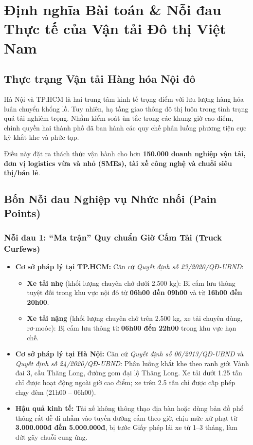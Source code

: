 \documentclass[11pt,a4paper]{article}
\begin{document}
\section{Định nghĩa Bài toán \& Nỗi đau Thực tế của Vận tải Đô thị Việt Nam}

\subsection{Thực trạng Vận tải Hàng hóa Nội đô}
Hà Nội và TP.HCM là hai trung tâm kinh tế trọng điểm với lưu lượng hàng hóa luân chuyển khổng lồ. Tuy nhiên, hạ tầng giao thông đô thị luôn trong tình trạng quá tải nghiêm trọng. Nhằm kiểm soát ùn tắc trong các khung giờ cao điểm, chính quyền hai thành phố đã ban hành các quy chế phân luồng phương tiện cực kỳ khắt khe và phức tạp.

Điều này đặt ra thách thức vận hành cho hơn \textbf{150.000 doanh nghiệp vận tải, đơn vị logistics vừa và nhỏ (SMEs), tài xế công nghệ và chuỗi siêu thị/bán lẻ}.

\subsection{Bốn Nỗi đau Nghiệp vụ Nhức nhối (Pain Points)}

\subsubsection{Nỗi đau 1: ``Ma trận'' Quy chuẩn Giờ Cấm Tải (Truck Curfews)}
\begin{itemize}
  \item \textbf{Cơ sở pháp lý tại TP.HCM:} Căn cứ \textit{Quyết định số 23/2020/QĐ-UBND}:
  \begin{itemize}
    \item \textbf{Xe tải nhẹ} (khối lượng chuyên chở dưới 2.500 kg): Bị cấm lưu thông tuyệt đối trong khu vực nội đô từ \textbf{06h00 đến 09h00} và từ \textbf{16h00 đến 20h00}.
    \item \textbf{Xe tải nặng} (khối lượng chuyên chở trên 2.500 kg, xe tải chuyên dùng, rơ-moóc): Bị cấm lưu thông từ \textbf{06h00 đến 22h00} trong khu vực hạn chế.
  \end{itemize}
  \item \textbf{Cơ sở pháp lý tại Hà Nội:} Căn cứ \textit{Quyết định số 06/2013/QĐ-UBND} và \textit{Quyết định số 24/2020/QĐ-UBND}: Phân luồng khắt khe theo ranh giới Vành đai 3, cầu Thăng Long, đường gom đại lộ Thăng Long. Xe tải dưới 1.25 tấn chỉ được hoạt động ngoài giờ cao điểm; xe trên 2.5 tấn chỉ được cấp phép chạy đêm (21h00 -- 06h00).
  \item \textbf{Hậu quả kinh tế:} Tài xế không thông thạo địa bàn hoặc dùng bản đồ phổ thông rất dễ đi nhầm vào tuyến đường cấm theo giờ, chịu mức xử phạt từ \textbf{3.000.000đ đến 5.000.000đ}, bị tước Giấy phép lái xe từ 1--3 tháng, làm đứt gãy chuỗi cung ứng.
\end{itemize}
\end{document}
